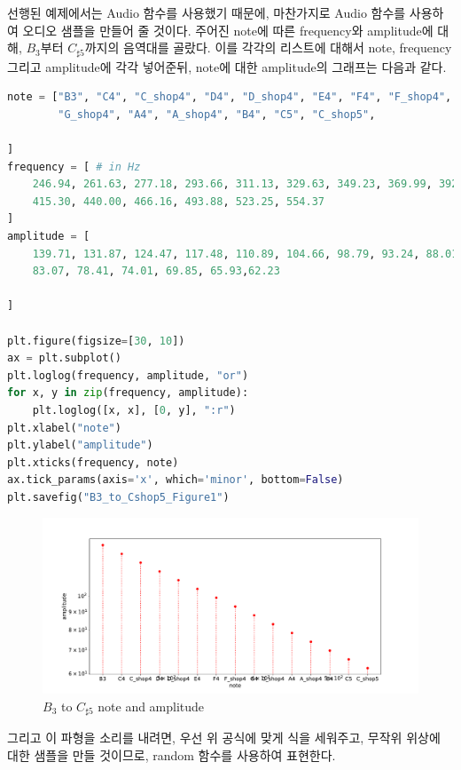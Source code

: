 \documentclass[11pt]{article}
\begin{document}
선행된 예제에서는 Audio 함수를 사용했기 때문에, 마찬가지로 Audio 함수를 사용하여 오디오 샘플을 만들어 줄 것이다.  주어진 note에 따른 frequency와 amplitude에 대해, $B_3$부터 $C_{\sharp5}$까지의 음역대를 골랐다. 이를 각각의 리스트에 대해서 note, frequency 그리고 amplitude에 각각 넣어준뒤, note에 대한 amplitude의 그래프는 다음과 같다.

\begin{lstlisting}[language=Python]
note = ["B3", "C4", "C_shop4", "D4", "D_shop4", "E4", "F4", "F_shop4", "G4", 
        "G_shop4", "A4", "A_shop4", "B4", "C5", "C_shop5",
        
]
frequency = [ # in Hz
    246.94, 261.63, 277.18, 293.66, 311.13, 329.63, 349.23, 369.99, 392.00, 
    415.30, 440.00, 466.16, 493.88, 523.25, 554.37
]
amplitude = [
    139.71, 131.87, 124.47, 117.48, 110.89, 104.66, 98.79, 93.24, 88.01, 
    83.07, 78.41, 74.01, 69.85, 65.93,62.23
    
]

plt.figure(figsize=[30, 10])
ax = plt.subplot()
plt.loglog(frequency, amplitude, "or")
for x, y in zip(frequency, amplitude):
    plt.loglog([x, x], [0, y], ":r")
plt.xlabel("note")
plt.ylabel("amplitude")
plt.xticks(frequency, note)
ax.tick_params(axis='x', which='minor', bottom=False)
plt.savefig("B3_to_Cshop5_Figure1")
\end{lstlisting}

\begin{figure}[!ht]
  \centering
  \includegraphics[width=1\textwidth]{B3_to_Cshop5_Figure1.pdf}
  \caption{$B_{3}$ to $C_{\sharp5}$  note and amplitude}
\end{figure}
\pagebreak
그리고 이 파형을 소리를 내려면, 우선 위 공식에 맞게 식을 세워주고, 무작위 위상에 대한 샘플을 만들 것이므로, random 함수를 사용하여 표현한다.
\end{document}
